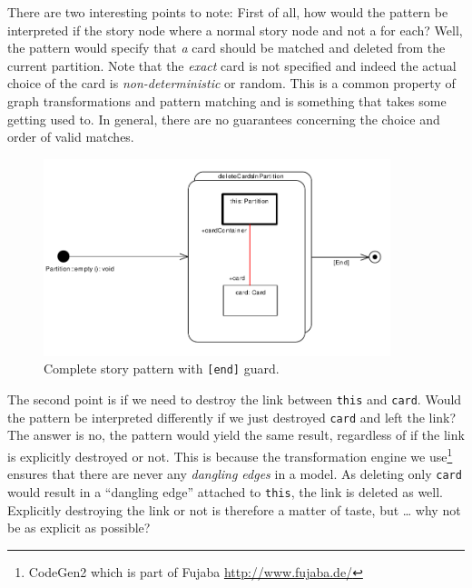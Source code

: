 There are two interesting points to note: First of all, how would the pattern be
interpreted if the story node where a normal story node and not a for each?
Well, the pattern would specify that \emph{a} card should
be matched and deleted from the current partition.  Note that the \emph{exact}
card is not specified and indeed the actual choice of the card is
\emph{non-deterministic} or random.  This is a common property of graph
transformations and pattern matching and is something that takes some getting
used to. In general, there are no guarantees concerning the choice and order of
valid matches.

\begin{figure}[htbp]
\begin{center}
  \includegraphics[width=0.9\textwidth]{pics/sdmBilder/empty/sdm47}
  \caption{Complete story pattern with \texttt{[end]} guard.}  
  \label{fig:sdm_end}
\end{center}
\end{figure}

The second point is if we need to destroy the link between \texttt{this} and
\texttt{card}.  Would the pattern be interpreted differently if we just
destroyed \texttt{card} and left the link?  The answer is no, the pattern would
yield the same result, regardless of if the link is explicitly destroyed or not.
This is because the transformation engine we use\footnote{CodeGen2 which is
part of Fujaba \url{http://www.fujaba.de/}} ensures that there are never any
\emph{dangling edges} in a model.  As deleting only \texttt{card} would result
in a ``dangling edge'' attached to \texttt{this}, the link is deleted as well.
Explicitly destroying the link or not is therefore a matter of taste, but \ldots
why not be as explicit as possible?
